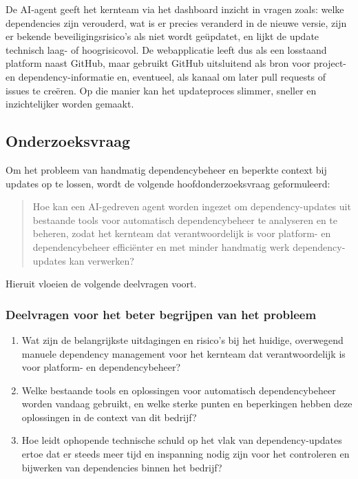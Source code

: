 De AI-agent geeft het kernteam via het dashboard inzicht in vragen zoals: welke dependencies zijn verouderd, wat is er precies veranderd in de nieuwe versie, zijn er bekende beveiligingsrisico's als niet wordt geüpdatet, en lijkt de update technisch laag- of hoogrisicovol. De webapplicatie leeft dus als een losstaand platform naast GitHub, maar gebruikt GitHub uitsluitend als bron voor project- en dependency-informatie en, eventueel, als kanaal om later pull requests of issues te creëren. Op die manier kan het updateproces slimmer, sneller en inzichtelijker worden gemaakt.

\subsection{Onderzoeksvraag}
\label{sec:Onderzoeksvraag}

Om het probleem van handmatig dependencybeheer en beperkte context bij updates op te lossen, wordt de volgende hoofdonderzoeksvraag geformuleerd:

\begin{quote}
  Hoe kan een AI-gedreven agent worden ingezet om dependency-updates uit bestaande tools voor automatisch dependencybeheer te analyseren en te beheren, zodat het kernteam dat verantwoordelijk is voor platform- en dependencybeheer efficiënter en met minder handmatig werk dependency-updates kan verwerken?
\end{quote}

Hieruit vloeien de volgende deelvragen voort.

\subsubsection{Deelvragen voor het beter begrijpen van het probleem}
\label{sec:Deelvragen_voor_het_beter_begrijpen_van_het_probleem}

\begin{enumerate}
  \item Wat zijn de belangrijkste uitdagingen en risico's bij het huidige, overwegend manuele dependency management voor het kernteam dat verantwoordelijk is voor platform- en dependencybeheer?
  \item Welke bestaande tools en oplossingen voor automatisch dependencybeheer worden vandaag gebruikt, en welke sterke punten en beperkingen hebben deze oplossingen in de context van dit bedrijf?
  \item Hoe leidt ophopende technische schuld op het vlak van dependency-updates ertoe dat er steeds meer tijd en inspanning nodig zijn voor het controleren en bijwerken van dependencies binnen het bedrijf?
\end{enumerate}

